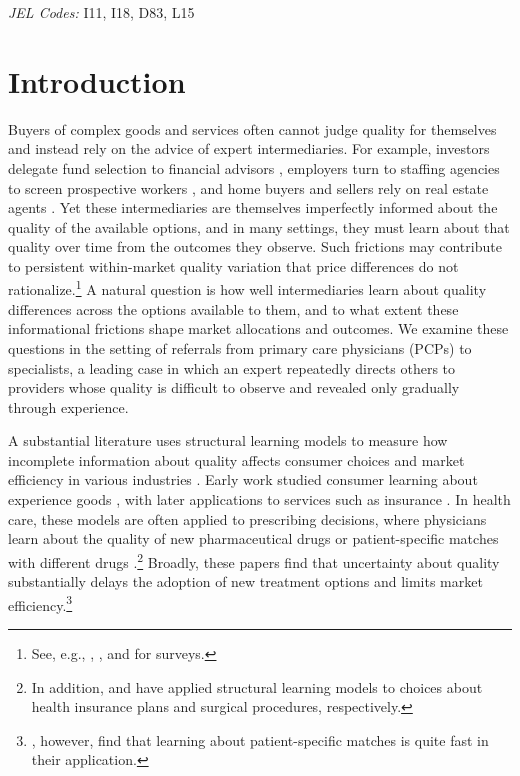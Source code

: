 \documentclass[12pt]{article}
\begin{document}
\smallskip
\noindent \textit{JEL Codes:} I11, I18, D83, L15

\clearpage
\newpage

\section{Introduction}
\label{sec:intro}

Buyers of complex goods and services often cannot judge quality for themselves and instead rely on the advice of expert intermediaries. For example, investors delegate fund selection to financial advisors \citep*{gennaioli2015, linnainmaa2021}, employers turn to staffing agencies to screen prospective workers \citep{stanton2016}, and home buyers and sellers rely on real estate agents \citep{levitt2008}. Yet these intermediaries are themselves imperfectly informed about the quality of the available options, and in many settings, they must learn about that quality over time from the outcomes they observe. Such frictions may contribute to persistent within-market quality variation that price differences do not rationalize.\footnote{See, e.g., \cite{kolstad2009}, \cite{dranove2010}, and \cite{dranove2019} for surveys.} A natural question is how well intermediaries learn about quality differences across the options available to them, and to what extent these informational frictions shape market allocations and outcomes. We examine these questions in the setting of referrals from primary care physicians (PCPs) to specialists, a leading case in which an expert repeatedly directs others to providers whose quality is difficult to observe and revealed only gradually through experience.

A substantial literature uses structural learning models to measure how incomplete information about quality affects consumer choices and market efficiency in various industries \citep*[see][for surveys]{ching2013, ching2017}. Early work studied consumer learning about experience goods \citep{erdem1996, ackerberg2003}, with later applications to services such as insurance \citep{israel2005}. In health care, these models are often applied to prescribing decisions, where physicians learn about the quality of new pharmaceutical drugs \citep*[e.g.,][]{coscelli2004, ching2010, ferreyra2011, chan2013} or patient-specific matches with different drugs \citep[e.g.,][]{crawford2005, dickstein2018}.\footnote{In addition, \cite*{chernew2008} and \cite{gong2018} have applied structural learning models to choices about health insurance plans and surgical procedures, respectively.} Broadly, these papers find that uncertainty about quality substantially delays the adoption of new treatment options and limits market efficiency.\footnote{\cite{crawford2005}, however, find that learning about patient-specific matches is quite fast in their application.}
\end{document}
